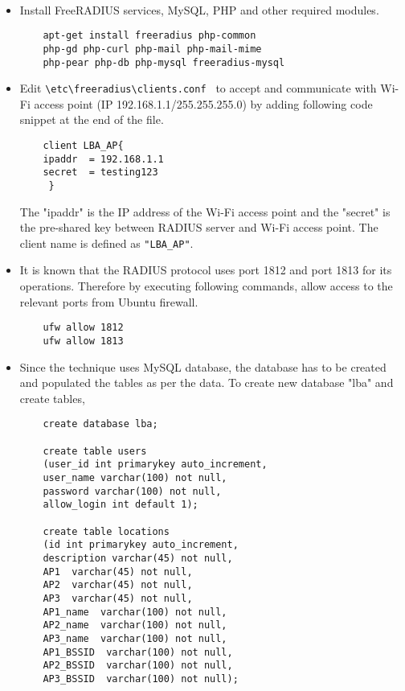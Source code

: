 \paragraph{}
 \begin{itemize}
 	\item Install FreeRADIUS services, MySQL, PHP and other required modules\cite{freeradius}. 
 	\begin{lstlisting}
	apt-get install freeradius php-common 
	php-gd php-curl php-mail php-mail-mime 
	php-pear php-db php-mysql freeradius-mysql 
 	\end{lstlisting}
 		
 	\item Edit \verb |\etc\freeradius\clients.conf | to accept and communicate with Wi-Fi access point (IP 192.168.1.1/255.255.255.0) by adding following code snippet at the end of the file.
 	\begin{lstlisting}
 	client LBA_AP{
 	ipaddr	= 192.168.1.1
 	secret	= testing123
 	 }
 	\end{lstlisting}
 		
 		The "ipaddr" is the IP address of the Wi-Fi access point and the "secret" is the pre-shared key between RADIUS server and Wi-Fi access point. The client name is defined as \verb|"LBA_AP"|.
 		
 	\item It is known that the RADIUS protocol uses port 1812 and port 1813 for its operations. Therefore by executing following commands, allow access to the relevant ports from Ubuntu firewall.
 	\begin{lstlisting}
	ufw allow 1812
	ufw allow 1813
 	\end{lstlisting}
 		
 		
 	\item Since the technique uses MySQL database, the database has to be created and populated the tables as per the data. To create new database "lba" and create tables,
 	
 	\begin{lstlisting}
 	create database lba;

 	create table users 
 	(user_id int primarykey auto_increment,
 	user_name varchar(100) not null,
 	password varchar(100) not null,
 	allow_login int default 1);
 		
 	create table locations 
 	(id int primarykey auto_increment,
 	description varchar(45) not null,
 	AP1  varchar(45) not null,
 	AP2  varchar(45) not null,
 	AP3  varchar(45) not null,
 	AP1_name  varchar(100) not null,
 	AP2_name  varchar(100) not null,
 	AP3_name  varchar(100) not null,
 	AP1_BSSID  varchar(100) not null,
 	AP2_BSSID  varchar(100) not null,
 	AP3_BSSID  varchar(100) not null);
 		

\end{lstlisting}
\end{itemize}
